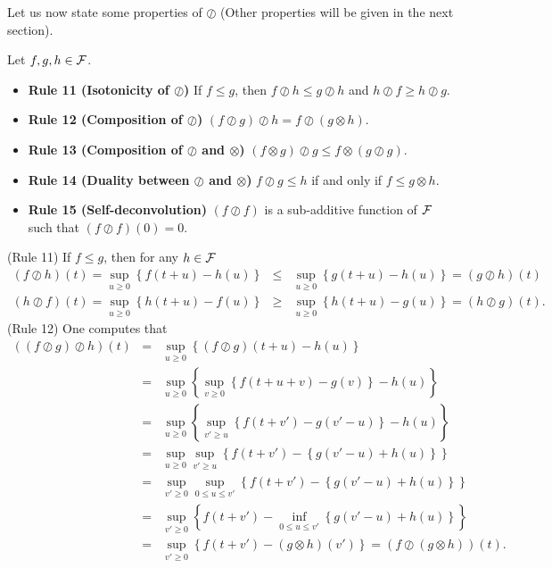 Let us now state some properties of $\oslash$ (Other properties will be given in the next section).
\begin{theorem}
Let $f, g, h \in \mathcal F$.
\begin{itemize}
\item{\textbf{Rule 11 (Isotonicity of $\oslash$)} If $f \leq g$, then $f \oslash h \leq g \oslash h$ and
$h \oslash f \geq h \oslash g$.}
\item{\textbf{Rule 12 (Composition of $\oslash$)} $(f \oslash g) \oslash h = f \oslash (g \otimes h)$.}
\item{\textbf{Rule 13 (Composition of $\oslash$ and $\otimes$)} $(f \otimes g) \oslash g \leq f \otimes (g \oslash g)$.}
\item{\textbf{Rule 14 (Duality between $\oslash$ and $\otimes$)} $f \oslash g \leq h$ if and only if
 $f \leq g \otimes h$.}
\item{\textbf{Rule 15 (Self-deconvolution)} $(f \oslash f)$ is a sub-additive function of $\mathcal F$ such that $(f \oslash f)(0) = 0$.}
\end{itemize}
\end{theorem}
\pr (Rule 11) If $f \leq g$, then for any $h \in \mathcal F$
\begin{eqnarray*}
(f \oslash h)(t)  =  \sup_{u \geq 0} \left\{ f(t+u) - h(u) \right\} & \leq &
           \sup_{u \geq 0} \left\{ g(t+u) - h(u) \right\} = (g \oslash h)(t) \\
(h \oslash f)(t)  =  \sup_{u \geq 0} \left\{ h(t+u) - f(u) \right\} & \geq &
           \sup_{u \geq 0} \left\{ h(t+u) - g(u) \right\} = (h \oslash g)(t)  .
\end{eqnarray*}
\vspace{1ex}
\noindent
(Rule 12) One computes that
\begin{eqnarray*}
((f \oslash g) \oslash h)(t) & = & \sup_{u \geq 0}  \left\{ (f \oslash g)(t+u) - h(u) \right\} \\
                & = & \sup_{u \geq 0}  \left\{ \sup_{v \geq 0} \left\{ f(t+u+v) - g(v) \right\} - h(u) \right\} \\
                 & = & \sup_{u \geq 0}  \left\{ \sup_{v' \geq u} \left\{ f(t+v') - g(v'-u) \right\} - h(u) \right\} \\
            & = & \sup_{u \geq 0}  \sup_{v' \geq u}  \left\{ f(t+v') -  \left\{  g(v'-u) + h(u)  \right\}\right\} \\
            & = & \sup_{v' \geq 0}  \sup_{0 \leq u \leq v'}  \left\{ f(t+v') -  \left\{  g(v'-u) + h(u)  \right\} \right\} \\
            & = & \sup_{v' \geq 0} \left\{ f(t+v') - \inf_{0 \leq u \leq v'} \left\{  g(v'-u) + h(u)  \right\} \right\} \\
            & = & \sup_{v' \geq 0} \left\{ f(t+v') - (g \otimes h)(v')  \right\} = (f \oslash (g \otimes h))(t)
.
\end{eqnarray*}
